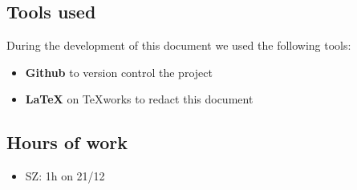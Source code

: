 \documentclass[11pt]{article} %
\begin{document}
\subsection{Tools used}
During the development of this document we used the following tools:
\begin{itemize}
	\item \textbf{Github} to version control the project
	\item \textbf{\LaTeX} on TeXworks to redact this document
\end{itemize}

\subsection{Hours of work}
\begin{itemize}
	\item SZ: 1h on 21/12
\end{itemize}
\end{document}
